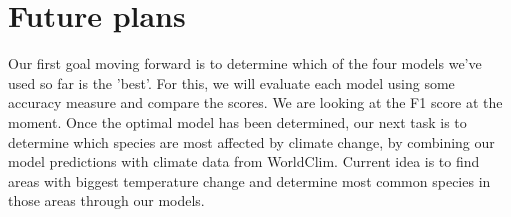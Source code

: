 \section*{Future plans}
Our first goal moving forward is to determine which of the four models we’ve used so far is the ’best’. For this, we will evaluate each model using some accuracy measure and compare the scores. We are looking at the F1 score at the moment. Once the optimal model has been determined, our next task is to determine which species are most affected by climate change, by combining our model predictions with climate data from WorldClim. Current idea is to find areas with biggest temperature change and determine most common species in those areas through our models.